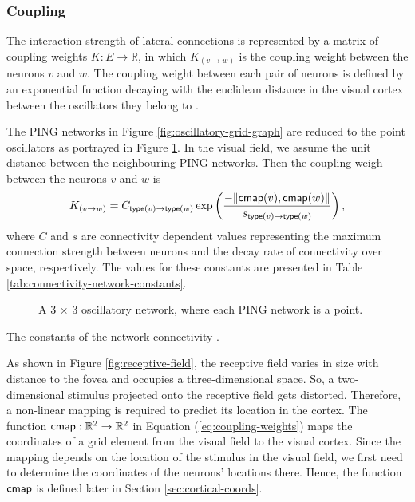 \subsubsection{Coupling}

The interaction strength of lateral connections is represented by a matrix of coupling weights $K: E \to \mathbb{R}$, in which $K_{(v \to w)}$ is the coupling weight between the neurons $v$ and $w$. 
The coupling weight between each pair of neurons is defined by an exponential function decaying with the euclidean distance in the visual cortex between the oscillators they belong to \cite{Lowet2015}. 

The PING networks in Figure \ref{fig:oscillatory-grid-graph} are reduced to the point oscillators as portrayed in Figure \ref{fig:oscillatory-point-grid}. In the visual field, we assume the unit distance between the neighbouring PING networks. Then the coupling weigh between the neurons $v$ and $w$ is
\begin{equation}
    K_{(v \to w)} = C_{\mathsf{type}(v) \to \mathsf{type}(w)} \exp \left( \frac{-\| \mathsf{cmap}(v), \mathsf{cmap}(w) \|}{s_{\mathsf{type}(v) \to \mathsf{type}(w)}} \right),
    \label{eq:coupling-weights}
\end{equation}
where $C$ and $s$ are connectivity dependent values representing the maximum connection strength between neurons and the decay rate of connectivity over space, respectively. The values for these constants are presented in Table \ref{tab:connectivity-network-constants}.

\begin{figure}[!htp]
    \centering
    
    \caption[Point-PING oscillatory network]{A 3 $\times$ 3 oscillatory network, where each PING network is a point.}
    \label{fig:oscillatory-point-grid}
\end{figure}

\begin{table}[!htp] 
    \centering
    
    \caption[Constants of the network connectivity]{The constants of the network connectivity \cite{Lowet2015}.}
    \label{tab:connectivity-network-constants}
\end{table}

As shown in Figure \ref{fig:receptive-field}, the receptive field varies in size with distance to the fovea and occupies a three-dimensional space. So, a two-dimensional stimulus projected onto the receptive field gets distorted. Therefore, a non-linear mapping is required to predict its location in the cortex.
The function $\mathsf{cmap}: \mathbb{R}^2 \to \mathbb{R}^2$ in Equation (\ref{eq:coupling-weights}) maps the coordinates of a grid element from the visual field to the visual cortex. Since the mapping depends on the location of the stimulus in the visual field, we first need to determine the coordinates of the neurons' locations there. Hence, the function $\mathsf{cmap}$ is defined later in Section \ref{sec:cortical-coords}.

\begin{comment}

Let $\loc: V \to \mathbb{Z}_+^2$ be a function mapping a neuron to the position of the oscillator it belongs to in the grid, assuming the unit distance between the neighbouring PING networks.

\end{comment}